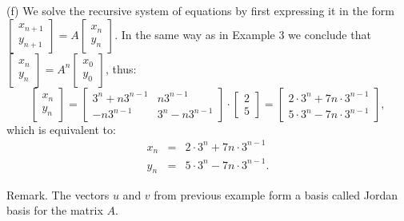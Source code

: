\documentclass[11pt]{article}
\theoremstyle{definition}
\theoremstyle{plain}
\begin{document}
    (f) We solve the recursive system of equations by first expressing it in the form \( \left[\begin{array}{c}x_{n+1}\\y_{n+1}\end{array}\right]=A\left[\begin{array}{c}x_{n}\\y_{n}\end{array}\right]\). In the same way as in Example 3 we conclude that \( \left[\begin{array}{c}x_{n}\\y_{n}\end{array}\right]= A^n\left[\begin{array}{c}x_{0}\\y_{0}\end{array}\right]\), thus: \[\left[\begin{array}{c}x_{n}\\y_{n}\end{array}\right]= \left[\begin{array}{cc} 3^n+n3^{n-1} & n3^{n-1}\\ -n3^{n-1} & 3^n-n3^{n-1}\end{array}\right]\cdot \left[\begin{array}{c}2\\5\end{array}\right]=\left[\begin{array}{c}2\cdot 3^n+7n\cdot 3^{n-1}\\5\cdot 3^n-7n\cdot 3^{n-1}\end{array}\right],\] which is equivalent to: \begin{eqnarray*} x_n&=&2\cdot 3^n+7n\cdot 3^{n-1}\\ y_n&=&5\cdot 3^n-7n\cdot 3^{n-1}. \end{eqnarray*}

Remark. The vectors \( u \) and \( v \) from previous example form a basis called Jordan basis for the matrix \( A \). 
\end{document}
